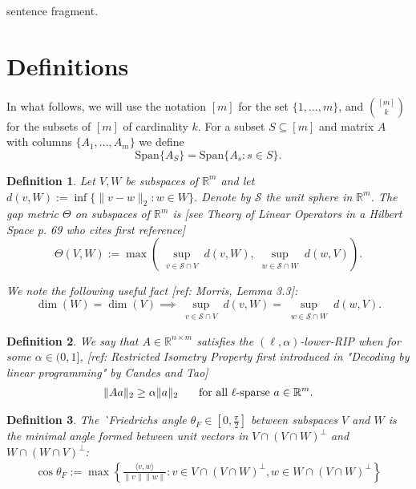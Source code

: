 \documentclass[journal,onecolumn]{IEEEtran}
\newtheorem{definition}{Definition}
\begin{document}
 sentence fragment. 

\section{Definitions}

In what follows, we will use the notation $[m]$ for the set $\{1, ..., m\}$, and ${[m] \choose k}$ for the subsets of $[m]$ of cardinality $k$. For a subset $S \subseteq [m]$ and matrix $A$ with columns $\{A_1,...,A_m\}$ we define
\begin{equation*}
\text{Span}\{A_S\} = \text{Span}\{A_s: s \in S\}.
\end{equation*}

\begin{definition}
Let $V, W$ be subspaces of $\mathbb{R}^m$ and let $d(v,W) := \inf\{\|v-w\|_2: w \in W\}$. Denote by $\mathcal{S}$ the unit sphere in $\mathbb{R}^m$. The \emph{gap} metric $\Theta$ on subspaces of $\mathbb{R}^{m}$ is [see Theory of Linear Operators in a Hilbert Space p. 69 who cites first reference]
\begin{equation}\label{SubspaceMetric}
\Theta(V,W) := \max\left( \sup_{\substack{v \in \mathcal{S} \cap V}} d(v,W), \sup_{\substack{w \in \mathcal{S} \cap W}} d(w,V) \right).
\end{equation}

We note the following useful fact [ref: Morris, Lemma 3.3]:
\begin{equation}\label{SubspaceMetricSameDim}
\dim(W) = \dim(V) \implies \sup_{\substack{v \in \mathcal{S} \cap V}} d(v,W)  = \sup_{\substack{w \in \mathcal{S} \cap W}} d(w,V).
\end{equation}
\end{definition}

\begin{definition}\label{RestrictedIsometryProperty}
We say that $A \in  \mathbb R^{n \times m}$ satisfies the \emph{$(\ell,\alpha)$-lower-RIP}  when for some $\alpha \in (0,1]$, [ref: Restricted Isometry Property first introduced in "Decoding by linear programming" by Candes and Tao]
\begin{align*}
\|Aa\|_2 \geq  \alpha \|a\|_2 \indent \text{ for all $\ell$-sparse } a \in \mathbb{R}^m.
\end{align*}
\end{definition}

\begin{definition}
The \emph`{Friedrichs angle} $\theta_F \in [0,\frac{\pi}{2}]$ between subspaces $V$ and $W$ is the minimal angle formed between unit vectors in $V \cap (V \cap W)^\perp$ and $W \cap (W \cap V)^\perp$:
\begin{align}
\cos\theta_F := \max\left\{ \frac{ \langle v, w \rangle }{\|v\|\|w\|}: v \in V \cap (V \cap W)^\perp, w \in W \cap (V \cap W)^\perp \right\}
\end{align}
\end{definition}
\end{document}
